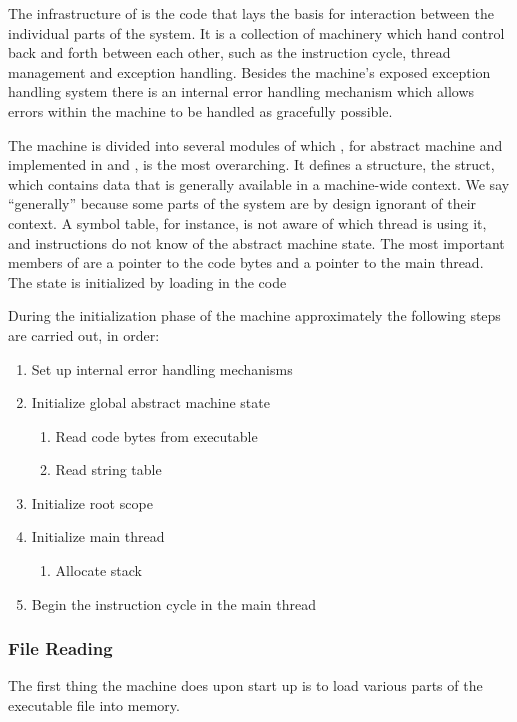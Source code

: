 The infrastructure of \thename{} is the code that lays the basis for interaction
between the individual parts of the system. It is a collection of machinery
which hand control back and forth between each other, such as the instruction
cycle, thread management and exception handling. Besides the machine's exposed
exception handling system there is an internal error handling mechanism which
allows errors within the machine to be handled as gracefully possible.

The machine is divided into several modules of which , for abstract
machine and implemented in  and , is the most
overarching. It defines a structure, the  struct, which contains
data that is generally available in a machine-wide context. We say ``generally''
because some parts of the system are by design ignorant of their context. A
symbol table, for instance, is not aware of which thread is using it, and
instructions do not know of the abstract machine state. The most important
members of  are a pointer to the code bytes and a pointer to the
main thread. The state is initialized by loading in  the code %

During the initialization phase of the machine approximately the following steps
are carried out, in order: %

\begin{enumerate}
\item Set up internal error handling mechanisms
\item Initialize global abstract machine state
  \begin{enumerate}
  \item Read code bytes from executable
  \item Read string table
  \end{enumerate}
\item Initialize root scope
\item Initialize main thread
  \begin{enumerate}
  \item Allocate stack
  \end{enumerate}
\item Begin the instruction cycle in the main thread
\end{enumerate}


\subsubsection{File Reading}
The first thing the machine does upon start up is to load various parts of the
executable file into memory. %

